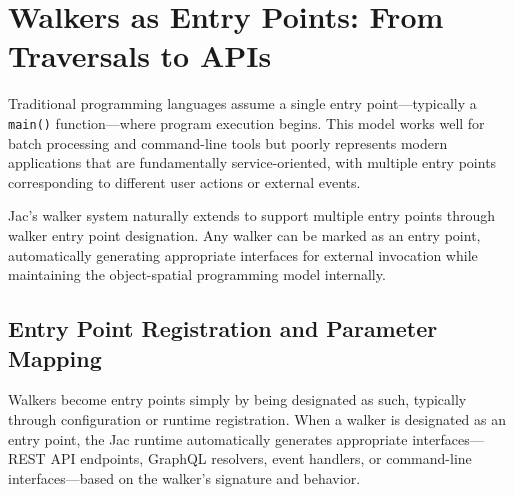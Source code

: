 \section{Walkers as Entry Points: From Traversals to APIs}

Traditional programming languages assume a single entry point—typically a \texttt{main()} function—where program execution begins. This model works well for batch processing and command-line tools but poorly represents modern applications that are fundamentally service-oriented, with multiple entry points corresponding to different user actions or external events.

Jac's walker system naturally extends to support multiple entry points through walker entry point designation. Any walker can be marked as an entry point, automatically generating appropriate interfaces for external invocation while maintaining the object-spatial programming model internally.

\subsection{Entry Point Registration and Parameter Mapping}

Walkers become entry points simply by being designated as such, typically through configuration or runtime registration. When a walker is designated as an entry point, the Jac runtime automatically generates appropriate interfaces—REST API endpoints, GraphQL resolvers, event handlers, or command-line interfaces—based on the walker's signature and behavior.

